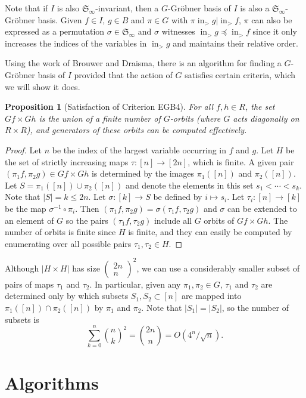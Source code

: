 \documentclass{amsart}
\newtheorem{proposition}[theorem]{Proposition}
\theoremstyle{definition}
\theoremstyle{remark}
\numberwithin{equation}{section}
\newcommand{\binomial}[2]{\left( 
\begin{array}{c} {#1} \\
                        {#2} \end{array} \right)}
\newcommand{\<}{\langle}
\renewcommand{\>}{\rangle}
\newcommand{\LT}{\operatorname{in}_>}
\begin{document}
Note that if $I$ is also ${\mathfrak S}_\infty$-invariant, then a $G$-Gr\"obner basis of $I$ is also a ${\mathfrak S}_\infty$-Gr\"obner basis.  Given $f \in I$, $g \in B$ and $\pi \in G$ with $\pi \LT{g}|\LT{f}$, $\pi$ can also be expressed as a permutation $\sigma \in {\mathfrak S}_\infty$ and $\sigma$ witnesses $\LT{g} \preceq \LT{f}$ since it only increases the indices of the variables in $\LT{g}$ and maintains their relative order.

Using the work of Brouwer and Draisma, there is an algorithm for finding a $G$-Gr\"obner basis of $I$ provided that the action of $G$ satisfies certain criteria, which we will show it does.
\begin{proposition}[Satisfaction of Criterion EGB4]
 For all $f,h \in R$, the set $Gf \times Gh$ is the union of a finite number of $G$-orbits (where $G$ acts diagonally on $R \times R$), and generators of these orbits can be computed effectively.
\end{proposition}
\begin{proof}
 Let $n$ be the index of the largest variable occurring in $f$ and $g$.  Let $H$ be the set of strictly increasing maps $\tau:[n] \to [2n]$, which is finite.  A given pair $(\pi_1 f, \pi_2 g) \in Gf \times Gh$ is determined by the images $\pi_1([n])$ and $\pi_2([n])$.  Let $S = \pi_1([n]) \cup \pi_2([n])$ and denote the elements in this set $s_1 < \cdots < s_k$.  Note that $|S| = k \leq 2n$.  Let $\sigma:[k] \to S$ be defined by $i \mapsto s_i$.  Let $\tau_i:[n] \to [k]$ be the map $\sigma^{-1} \circ \pi_i$.  Then $(\pi_1 f, \pi_2 g) = \sigma(\tau_1 f,\tau_2 g)$ and $\sigma$ can be extended to an element of $G$ so the pairs $(\tau_1 f,\tau_2 g)$ include all $G$ orbits of $Gf \times Gh$.  The number of orbits is finite since $H$ is finite, and they can easily be computed by enumerating over all possible pairs $\tau_1,\tau_2 \in H$.
\end{proof}

Although $|H\times H|$ has size $\binomial{2n}{n}^2$, we can use a considerably smaller subset of pairs of maps $\tau_1$ and $\tau_2$.  In particular, given any $\pi_1, \pi_2 \in G$, $\tau_1$ and $\tau_2$ are determined only by which subsets $S_1, S_2 \subset [n]$ are mapped into $\pi_1([n]) \cap \pi_2([n])$ by $\pi_1$ and $\pi_2$.  Note that $|S_1| = |S_2|$, so the number of subsets is
\[ \sum_{k=0}^n \binom{n}{k}^2 = \binom{2n}{n} = O(4^n/\sqrt{n}). \]


\section{Algorithms}
\end{document}
